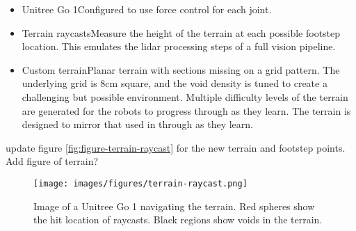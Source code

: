 \begin{itemize}
  \item Unitree Go 1\textemdash Configured to use force control for each joint.
  \item Terrain raycasts\textemdash Measure the height of the terrain
    at each possible footstep location. This emulates the lidar
    processing steps of a full vision pipeline.
  \item Custom terrain\textemdash Planar terrain with sections
    missing on a grid pattern. The underlying grid is 8cm square, and
    the void density is tuned to create a challenging but possible
    environment. Multiple difficulty levels of the terrain are generated
    for the robots to progress through as they learn.
    The terrain is designed to mirror that used in
    \cite{bratta_contactnet_2024}
    through as they learn.
\end{itemize}

\begin{todo}
  update figure \autoref{fig:figure-terrain-raycast} for the new
  terrain and footstep points.
  Add figure of terrain?
\end{todo}

\begin{figure}[H]
  \centering
  \texttt{[image: images/figures/terrain-raycast.png]}
  \caption{Image of a Unitree Go 1 navigating the terrain. Red
    spheres show the hit location of raycasts. Black regions show voids
  in the terrain.}
  \label{fig:figure-terrain-raycast}
\end{figure}
